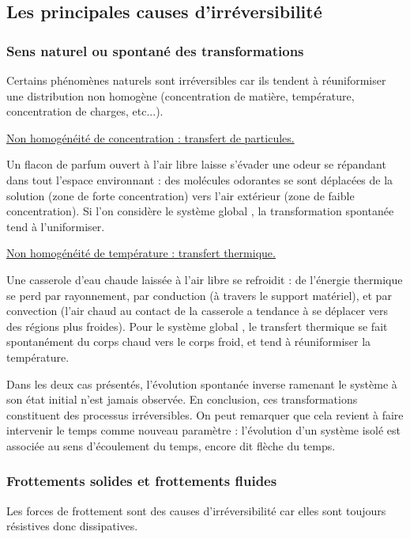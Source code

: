 \subsection{Les principales causes d'irréversibilité}

\subsubsection{Sens naturel ou spontané des transformations}

Certains phénomènes naturels sont irréversibles car ils tendent à réuniformiser une distribution non homogène (concentration de matière, température, concentration de charges, etc...).

\underline{Non homogénéité de concentration : transfert de particules.}

Un flacon de parfum ouvert à l'air libre laisse s'évader une odeur se répandant dans tout l'espace environnant : des molécules odorantes se sont déplacées de la solution (zone de forte concentration) vers l'air extérieur (zone de faible concentration). Si l'on considère le système global , la transformation spontanée tend à l'uniformiser.

\underline{Non homogénéité de température : transfert thermique.}

Une casserole d'eau chaude laissée à l'air libre se refroidit : de l'énergie thermique se perd par rayonnement, par conduction (à travers le support matériel), et par convection (l'air chaud au contact de la casserole a tendance à se déplacer vers des régions plus froides). Pour le système global , le transfert thermique se fait spontanément du corps chaud vers le corps froid, et tend à réuniformiser la température.

Dans les deux cas présentés, l'évolution spontanée inverse ramenant le système à son état initial n'est jamais observée. En conclusion, ces transformations constituent des processus irréversibles. On peut remarquer que cela revient à faire intervenir le temps comme nouveau paramètre : l'évolution d'un système isolé est associée au sens d'écoulement du temps, encore dit flèche du temps.

\subsubsection{Frottements solides et frottements fluides}

Les forces de frottement sont des causes d'irréversibilité car elles sont toujours résistives donc dissipatives.

